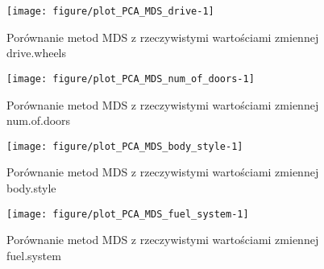 \documentclass[12pt, a4paper]{article}\usepackage[]{graphicx}\usepackage[]{xcolor}
\makeatletter
\def\maxwidth{ %
  \ifdim\Gin@nat@width>\linewidth
    \linewidth
  \else
    \Gin@nat@width
  \fi
}
\newenvironment{knitrout}{}{} %
\makeatother
\begin{document}
\begin{knitrout}
\color{fgcolor}\begin{figure}[H]

{\centering \texttt{[image: figure/plot\_PCA\_MDS\_drive-1]} 

}

\caption[Porównanie metod MDS z rzeczywistymi wartościami zmiennej drive.wheels]{Porównanie metod MDS z rzeczywistymi wartościami zmiennej drive.wheels}\label{fig:plot_PCA_MDS_drive}
\end{figure}

\end{knitrout}

\begin{knitrout}
\color{fgcolor}\begin{figure}[H]

{\centering \texttt{[image: figure/plot\_PCA\_MDS\_num\_of\_doors-1]} 

}

\caption[Porównanie metod MDS z rzeczywistymi wartościami zmiennej num.of.doors]{Porównanie metod MDS z rzeczywistymi wartościami zmiennej num.of.doors}\label{fig:plot_PCA_MDS_num.of.doors}
\end{figure}

\end{knitrout}

\begin{knitrout}
\color{fgcolor}\begin{figure}[H]

{\centering \texttt{[image: figure/plot\_PCA\_MDS\_body\_style-1]} 

}

\caption[Porównanie metod MDS z rzeczywistymi wartościami zmiennej body.style]{Porównanie metod MDS z rzeczywistymi wartościami zmiennej body.style}\label{fig:plot_PCA_MDS_body.style}
\end{figure}

\end{knitrout}

\begin{knitrout}
\color{fgcolor}\begin{figure}[H]

{\centering \texttt{[image: figure/plot\_PCA\_MDS\_fuel\_system-1]} 

}

\caption[Porównanie metod MDS z rzeczywistymi wartościami zmiennej fuel.system]{Porównanie metod MDS z rzeczywistymi wartościami zmiennej fuel.system}\label{fig:plot_PCA_MDS_fuel.system}
\end{figure}

\end{knitrout}
\end{document}
